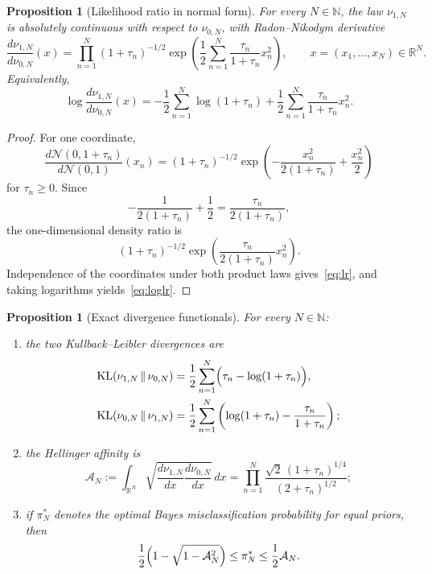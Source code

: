 \documentclass[11pt,a4paper]{amsart}
\theoremstyle{plain}
\newtheorem{proposition}[theorem]{Proposition}
\theoremstyle{definition}
\theoremstyle{remark}
\DeclareMathOperator{\KL}{KL}
\newcommand{\R}{\mathbb{R}}
\newcommand{\N}{\mathbb{N}}
\newcommand{\Acal}{\mathcal A}
\begin{document}
\begin{proposition}[Likelihood ratio in normal form]\label{prop:lr}
For every $N\in\N$, the law $\nu_{1,N}$ is absolutely continuous with respect to
$\nu_{0,N}$, with Radon--Nikodym derivative
\begin{equation}\label{eq:lr}
\frac{d\nu_{1,N}}{d\nu_{0,N}}(x)
=
\prod_{n=1}^N (1+\tau_n)^{-1/2}
\exp\!\left(
\frac12 \sum_{n=1}^N \frac{\tau_n}{1+\tau_n}x_n^2
\right),
\qquad x=(x_1,\dots,x_N)\in\R^N.
\end{equation}
Equivalently,
\begin{equation}\label{eq:loglr}
\log \frac{d\nu_{1,N}}{d\nu_{0,N}}(x)
=
-\frac12\sum_{n=1}^N \log(1+\tau_n)
+ \frac12\sum_{n=1}^N \frac{\tau_n}{1+\tau_n}x_n^2.
\end{equation}
\end{proposition}

\begin{proof}
For one coordinate,
\[
\frac{d\mathcal N(0,1+\tau_n)}{d\mathcal N(0,1)}(x_n)
=
(1+\tau_n)^{-1/2}
\exp\!\left(
-\frac{x_n^2}{2(1+\tau_n)}+\frac{x_n^2}{2}
\right)
\]
for $\tau_n\ge0$. Since
\[
-\frac{1}{2(1+\tau_n)}+\frac12
=
\frac{\tau_n}{2(1+\tau_n)},
\]
the one-dimensional density ratio is
\[
(1+\tau_n)^{-1/2}
\exp\!\left(\frac{\tau_n}{2(1+\tau_n)}x_n^2\right).
\]
Independence of the coordinates under both product laws gives~\eqref{eq:lr}, and taking
logarithms yields~\eqref{eq:loglr}.
\end{proof}

\begin{proposition}[Exact divergence functionals]\label{prop:div}
For every $N\in\N$:
\begin{enumerate}[label=(\roman*)]
\item the two Kullback--Leibler divergences are
\begin{align}
\KL(\nu_{1,N}\,\|\,\nu_{0,N})
&=
\frac12\sum_{n=1}^N \Bigl(\tau_n-\log(1+\tau_n)\Bigr), \label{eq:kl10}\\
\KL(\nu_{0,N}\,\|\,\nu_{1,N})
&=
\frac12\sum_{n=1}^N \left(\log(1+\tau_n)-\frac{\tau_n}{1+\tau_n}\right); \label{eq:kl01}
\end{align}
\item the Hellinger affinity is
\begin{equation}\label{eq:affinity}
\Acal_N
:=
\int_{\R^N}\sqrt{\frac{d\nu_{1,N}}{dx}\frac{d\nu_{0,N}}{dx}}\,dx
=
\prod_{n=1}^N
\frac{\sqrt{2}\,(1+\tau_n)^{1/4}}{(2+\tau_n)^{1/2}};
\end{equation}
\item if $\pi_N^\ast$ denotes the optimal Bayes misclassification probability for equal
priors, then
\begin{equation}\label{eq:bayes-bounds}
\frac12\Bigl(1-\sqrt{1-\Acal_N^2}\Bigr)
\le
\pi_N^\ast
\le
\frac12 \Acal_N.
\end{equation}
\end{enumerate}
\end{proposition}
\end{document}
